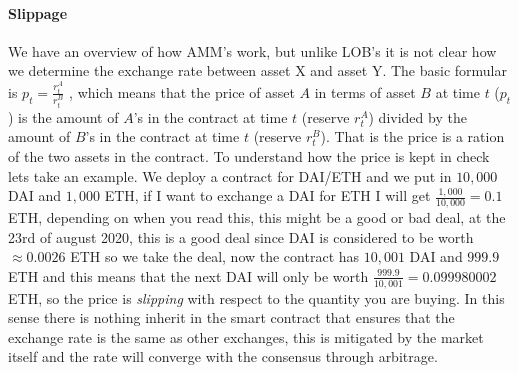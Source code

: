 \paragraph{Slippage} We have an overview of how AMM's work, but unlike LOB's it is not clear how we determine the exchange rate between asset X and asset Y. The basic formular is $p_t=\frac{r^A_t}{r^B_t}$ \cite[eq 1, page 2]{uniswap}, which means that the price of asset $A$ in terms of asset $B$ at time $t$ ($p_t$) is the amount of $A$'s in the contract at time $t$ (reserve $r^A_t$) divided by the amount of $B$'s in the contract at time $t$ (reserve $r^B_t$). That is the price is a ration of the two assets in the contract. To understand how the price is kept in check lets take an example. We deploy a contract for DAI/ETH and we put in $10,000$ DAI and $1,000$ ETH, if I want to exchange a DAI for ETH I will get $\frac{1,000}{10,000}=0.1$ ETH, depending on when you read this, this might be a good or bad deal, at the 23rd of august 2020, this is a good deal since DAI is considered to be worth $\approx 0.0026$ ETH so we take the deal, now the contract has $10,001$ DAI and $999.9$ ETH and this means that the next DAI will only be worth $\frac{999.9}{10,001}=0.099980002$ ETH, so the price is \textit{slipping} with respect to the quantity you are buying. In this sense there is nothing inherit in the smart contract that ensures that the exchange rate is the same as other exchanges, this is mitigated by the market itself and the rate will converge with the consensus through arbitrage. %
